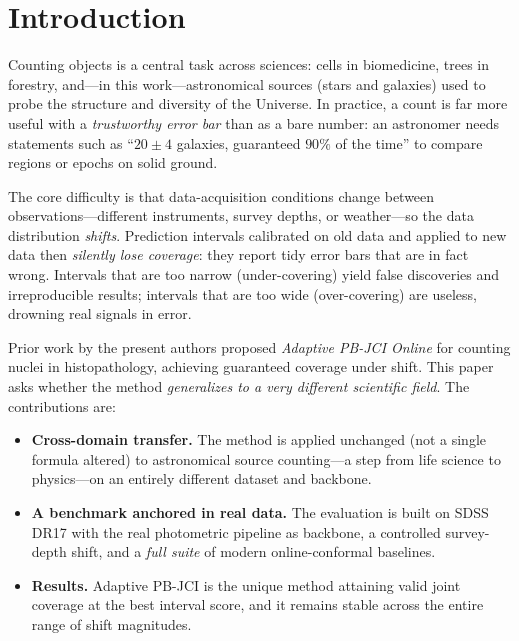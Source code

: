 \documentclass[pdflatex,sn-mathphys-num]{sn-jnl}%
\begin{document}
\maketitle

\section{Introduction}\label{sec:intro}

Counting objects is a central task across sciences: cells in biomedicine, trees in forestry, and---in this
work---astronomical sources (stars and galaxies) used to probe the structure and diversity of the Universe.
In practice, a count is far more useful with a \emph{trustworthy error bar} than as a bare number: an
astronomer needs statements such as ``$20 \pm 4$ galaxies, guaranteed $90\%$ of the time'' to compare
regions or epochs on solid ground.

The core difficulty is that data-acquisition conditions change between observations---different instruments,
survey depths, or weather---so the data distribution \emph{shifts}. Prediction intervals calibrated on old
data and applied to new data then \emph{silently lose coverage}: they report tidy error bars that are in
fact wrong. Intervals that are too narrow (under-covering) yield false discoveries and irreproducible
results; intervals that are too wide (over-covering) are useless, drowning real signals in error.

Prior work by the present authors proposed \emph{Adaptive PB-JCI Online} for counting nuclei in
histopathology, achieving guaranteed coverage under shift. This paper asks whether the method
\emph{generalizes to a very different scientific field}. The contributions are:
\begin{itemize}
\item \textbf{Cross-domain transfer.} The method is applied unchanged (not a single formula altered) to
astronomical source counting---a step from life science to physics---on an entirely different dataset and
backbone.
\item \textbf{A benchmark anchored in real data.} The evaluation is built on SDSS DR17 with the real
photometric pipeline as backbone, a controlled survey-depth shift, and a \emph{full suite} of modern
online-conformal baselines.
\item \textbf{Results.} Adaptive PB-JCI is the unique method attaining valid joint coverage at the best
interval score, and it remains stable across the entire range of shift magnitudes.
\end{itemize}
\end{document}
